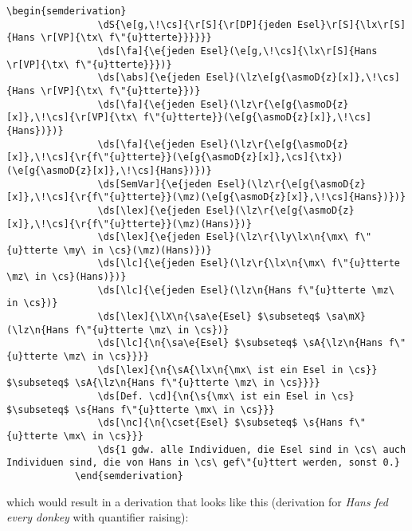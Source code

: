 \documentclass[10pt, a4paper]{article}
\begin{document}
	\begin{lstlisting}[style=B]
			\begin{semderivation}
				\dS{\e[g,\!\cs]{\r[S]{\r[DP]{jeden Esel}\r[S]{\lx\r[S]{Hans \r[VP]{\tx\ f\"{u}tterte}}}}}}
				\ds[\fa]{\e{jeden Esel}(\e[g,\!\cs]{\lx\r[S]{Hans \r[VP]{\tx\ f\"{u}tterte}}})}
				\ds[\abs]{\e{jeden Esel}(\lz\e[g{\asmoD{z}[x]},\!\cs]{Hans \r[VP]{\tx\ f\"{u}tterte}})}
				\ds[\fa]{\e{jeden Esel}(\lz\r{\e[g{\asmoD{z}[x]},\!\cs]{\r[VP]{\tx\ f\"{u}tterte}}(\e[g{\asmoD{z}[x]},\!\cs]{Hans})})}
				\ds[\fa]{\e{jeden Esel}(\lz\r{\e[g{\asmoD{z}[x]},\!\cs]{\r{f\"{u}tterte}}(\e[g{\asmoD{z}[x]},\cs]{\tx})(\e[g{\asmoD{z}[x]},\!\cs]{Hans})})}
				\ds[SemVar]{\e{jeden Esel}(\lz\r{\e[g{\asmoD{z}[x]},\!\cs]{\r{f\"{u}tterte}}(\mz)(\e[g{\asmoD{z}[x]},\!\cs]{Hans})})}
				\ds[\lex]{\e{jeden Esel}(\lz\r{\e[g{\asmoD{z}[x]},\!\cs]{\r{f\"{u}tterte}}(\mz)(Hans)})}
				\ds[\lex]{\e{jeden Esel}(\lz\r{\ly\lx\n{\mx\ f\"{u}tterte \my\ in \cs}(\mz)(Hans)})}
				\ds[\lc]{\e{jeden Esel}(\lz\r{\lx\n{\mx\ f\"{u}tterte \mz\ in \cs}(Hans)})}
				\ds[\lc]{\e{jeden Esel}(\lz\n{Hans f\"{u}tterte \mz\ in \cs})}
				\ds[\lex]{\lX\n{\sa\e{Esel} $\subseteq$ \sa\mX}(\lz\n{Hans f\"{u}tterte \mz\ in \cs})}
				\ds[\lc]{\n{\sa\e{Esel} $\subseteq$ \sA{\lz\n{Hans f\"{u}tterte \mz\ in \cs}}}}
				\ds[\lex]{\n{\sA{\lx\n{\mx\ ist ein Esel in \cs}} $\subseteq$ \sA{\lz\n{Hans f\"{u}tterte \mz\ in \cs}}}}
				\ds[Def. \cd]{\n{\s{\mx\ ist ein Esel in \cs} $\subseteq$ \s{Hans f\"{u}tterte \mx\ in \cs}}}
				\ds[\nc]{\n{\cset{Esel} $\subseteq$ \s{Hans f\"{u}tterte \mx\ in \cs}}}
				\ds{1 gdw. alle Individuen, die Esel sind in \cs\ auch Individuen sind, die von Hans in \cs\ gef\"{u}ttert werden, sonst 0.}
			\end{semderivation}
	\end{lstlisting}
	which would result in a derivation that looks like this (derivation for \textit{Hans fed every donkey} with quantifier raising):
\end{document}
